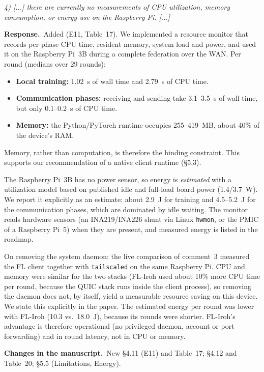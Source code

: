 \documentclass[11pt,a4paper]{article}
\newenvironment{comment}{\par\medskip\noindent\begin{minipage}{\linewidth}\color{blue!45!black}\itshape}{\end{minipage}\par}
\newcommand{\reply}{\par\smallskip\noindent\textbf{Response.}~}
\newcommand{\changes}{\par\smallskip\noindent\textbf{Changes in the manuscript.}~}
\begin{document}
\begin{comment}
4) [...] there are currently no measurements of CPU utilization, memory consumption, or energy use on the Raspberry Pi. [...]
\end{comment}
\reply Added (E11, Table~17). We implemented a resource monitor that records per-phase CPU time, resident memory, system load and power, and used it on the Raspberry Pi~3B during a complete federation over the WAN. Per round (medians over 29 rounds):
\begin{itemize}[leftmargin=1.3em,itemsep=0.1em]
\item \textbf{Local training:} 1.02~s of wall time and 2.79~s of CPU time.
\item \textbf{Communication phases:} receiving and sending take 3.1--3.5~s of wall time, but only 0.1--0.2~s of CPU time.
\item \textbf{Memory:} the Python/PyTorch runtime occupies 255--419~MB, about 40\% of the device's RAM.
\end{itemize}
Memory, rather than computation, is therefore the binding constraint. This supports our recommendation of a native client runtime (\S5.3).

The Raspberry Pi~3B has no power sensor, so energy is \emph{estimated} with a utilization model based on published idle and full-load board power (1.4/3.7~W). We report it explicitly as an estimate: about 2.9~J for training and 4.5--5.2~J for the communication phases, which are dominated by idle waiting. The monitor reads hardware sensors (an INA219/INA226 shunt via Linux \texttt{hwmon}, or the PMIC of a Raspberry Pi~5) when they are present, and measured energy is listed in the roadmap.

On removing the system daemon: the live comparison of comment~3 measured the FL client together with \texttt{tailscaled} on the same Raspberry Pi. CPU and memory were similar for the two stacks (FL-Iroh used about 10\% more CPU time per round, because the QUIC stack runs inside the client process), so removing the daemon does not, by itself, yield a measurable resource saving on this device. We state this explicitly in the paper. The estimated energy per round was lower with FL-Iroh (10.3 vs.\ 18.0~J), because its rounds were shorter. FL-Iroh's advantage is therefore operational (no privileged daemon, account or port forwarding) and in round latency, not in CPU or memory.

\changes New \S4.11 (E11) and Table~17; \S4.12 and Table~20; \S5.5 (Limitations, Energy).
\end{document}
